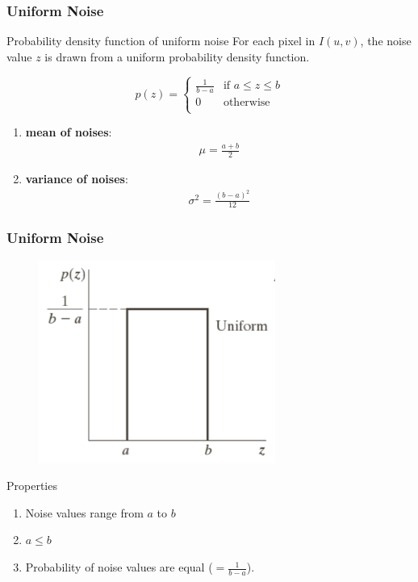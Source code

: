\documentclass[english,11pt,table,handout]{beamer}
\begin{document}
\frame
{
	\frametitle{Uniform Noise}
	\begin{block}{Probability density function of uniform noise}
		For each pixel in $I(u,v)$, the noise value $z$ is drawn from a uniform probability density function.
		
		$$
		p(z) =
		\begin{cases}
		\frac{1}{b-a}& \text{if } a \le z \le b \\
		0 & \text{otherwise} \\
		\end{cases}
		$$
		
		\begin{enumerate}
			\item \alert{\textbf{mean of noises}}: 
			\begin{align}
			\nonumber
			\mu = \frac{a+b}{2}
			\end{align}
			\item \alert{\textbf{variance of noises}}:
			\begin{align}
			\nonumber
			\sigma^2 = \frac{(b-a)^2}{12}
			\end{align}
		\end{enumerate}
		
	\end{block}
	
}
\frame
{
	\frametitle{Uniform Noise}
	\begin{figure}[!h]
		\includegraphics[scale=1.0]{uniform.png}
	\end{figure}
	
	\begin{alertblock}{Properties}
		\begin{enumerate}
			\item Noise values range from $a$ to $b$
			\item $a \le b$
			\item Probability of noise values are equal ($=\frac{1}{b-a}$).
			\end{enumerate}
	\end{alertblock}
}
\end{document}
